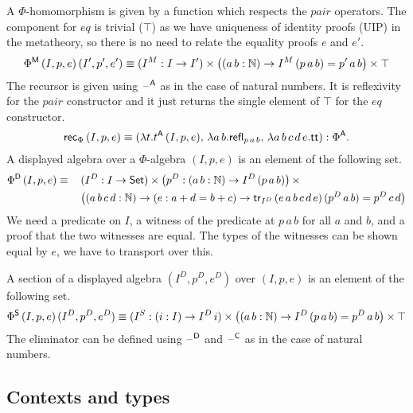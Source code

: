 \documentclass[acmsmall,review]{acmart}\settopmatter{printfolios=true,printccs=false,printacmref=false}
\begin{document}
A $\Phi$-homomorphism is given by a function which respects the
$\mathit{pair}$ operators. The component for $\mathit{eq}$ is trivial ($\top$)
as we have uniqueness of identity proofs (UIP) in the metatheory, so
there is no need to relate the equality proofs $e$ and $e'$.
\[
\Phi^{\mathsf{M}}\,(I,p,e)\,(I',p',e')\equiv (I^M:I\rightarrow I')\times\big((a\,b:\mathbb{N})\rightarrow I^M\,(p\,a\,b)=p'\,a\,b\big)\times\top
\]
The recursor is given using $\mathord{\hspace{1pt}\text{--}\hspace{1pt}}^{\mathsf{A}}$ as in the case of natural
numbers. It is reflexivity for the $\mathit{pair}$ constructor and it
just returns the single element of $\top$ for the $\mathit{eq}$
constructor.
\[
\mathsf{rec}_\Phi\,(I,p,e) \equiv (\lambda t.t^{\mathsf{A}}\,(I,p,e),\, \lambda a\,b.\mathsf{refl}_{p\,a\,b},\, \lambda a\,b\,c\,d\,e.\mathsf{tt}):\Phi^{\mathsf{A}}.
\]
A displayed algebra over a $\Phi$-algebra $(I,p,e)$ is an element of
the following set.
\begin{alignat*}{5}
  & \Phi^{\mathsf{D}}\,(I,p,e) \equiv\, &&  (I^D:I\rightarrow\mathsf{Set})\times\big(p^D:(a\,b:\mathbb{N})\rightarrow I^D\,(p\,a\,b)\big)\,\times \\
  & && \big((a\,b\,c\,d:\mathbb{N})\rightarrow(e:a+d=b+c)\rightarrow\mathsf{tr}_{I^D}\,(e\,a\,b\,c\,d\,e)\,(p^D\,a\,b)=p^D\,c\,d\big)
\end{alignat*}
We need a predicate on $I$, a witness of the predicate at $p\,a\,b$
for all $a$ and $b$, and a proof that the two witnesses are equal. The
types of the witnesses can be shown equal by $e$, we have to transport
over this.

A section of a displayed algebra $(I^D,p^D,e^D)$ over $(I,p,e)$ is an
element of the following set.
\[
\Phi^{\mathsf{S}}\,(I,p,e)\,(I^D,p^D,e^D)\equiv (I^S:(i:I)\rightarrow I^D\,i)\times\big((a\,b:\mathbb{N})\rightarrow I^D\,(p\,a\,b)=p^D\,a\,b\big)\times\top
\]
The eliminator can be defined using $\mathord{\hspace{1pt}\text{--}\hspace{1pt}}^{\mathsf{D}}$ and $\mathord{\hspace{1pt}\text{--}\hspace{1pt}}^{\mathsf{C}}$ as in
the case of natural numbers.

\subsection{Contexts and types}
\label{sec:conty}
\end{document}
